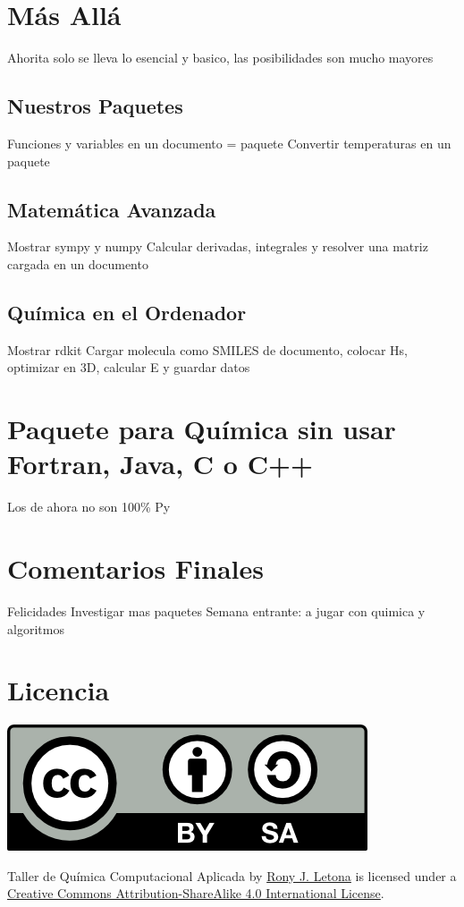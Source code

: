 \documentclass[10pt,letterpaper]{article}
\begin{document}
\section{M\'as All\'a}
Ahorita solo se lleva lo esencial y basico, las posibilidades son mucho mayores
\subsection{Nuestros Paquetes}
Funciones y variables en un documento = paquete
Convertir temperaturas en un paquete
\subsection{Matem\'atica Avanzada}
Mostrar sympy y numpy
Calcular derivadas, integrales y resolver una matriz cargada en un documento
\subsection{Qu\'imica en el Ordenador}
Mostrar rdkit
Cargar molecula como SMILES de documento, colocar Hs, optimizar en 3D, calcular E y guardar datos
\section{Paquete para Qu\'imica sin usar Fortran, Java, C o C++}
Los de ahora no son 100\% Py
\section{Comentarios Finales}
Felicidades
Investigar mas paquetes
Semana entrante: a jugar con quimica y algoritmos

\section*{Licencia}

\noindent \includegraphics{img/cc_big.png}

\noindent Taller de Qu\'imica Computacional Aplicada by \href{http://github.com/zronyj/TQCA}{Rony J. Letona} is licensed under a \href{http://creativecommons.org/licenses/by-sa/4.0/}{Creative Commons Attribution-ShareAlike 4.0 International License}.
\end{document}
